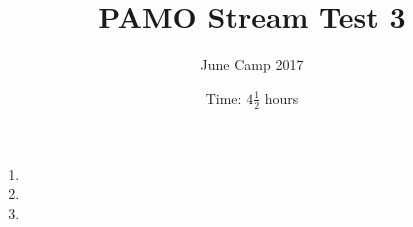 \documentclass{article}
\title{PAMO Stream Test 3}
\author{June Camp 2017}
\date{Time: $4\frac{1}{2}$ hours}
\begin{document}
 \maketitle

\begin{enumerate}

\item %
	

\item %
	

\item %
	

\end{enumerate}
\end{document}
